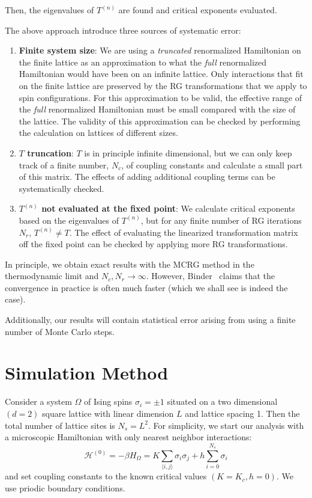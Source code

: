 \documentclass[12pt]{article}
\begin{document}
Then, the eigenvalues of $T^{(n)}$ are found and critical exponents evaluated.

The above approach introduce three sources of systematic error:
\renewcommand{\labelenumi}{(\roman{enumi})}
\begin{enumerate}
  \item \textbf{Finite system size}: We are using a \textit{truncated} renormalized Hamiltonian on the finite lattice as an approximation to what the \textit{full} renormalized Hamiltonian would have been on an infinite lattice. Only interactions that fit on the finite lattice are preserved by the RG transformations that we apply to spin configurations. For this approximation to be valid, the effective range of the \textit{full} renormalized Hamiltonian must be small compared with the size of the lattice. The validity of this approximation can be checked by performing the calculation on lattices of different sizes.
  \item \textbf{$T$ truncation}: $T$ is in principle infinite dimensional, but we can only keep track of a finite number, $N_c$, of coupling constants and calculate a small part of this matrix. The effects of adding additional coupling terms can be systematically checked.
  \item \textbf{$T^{(n)}$ not evaluated at the fixed point}: We calculate critical exponents based on the eigenvalues of $T^{(n)}$, but for any finite number of RG iterations $N_r$, $T^{(n)} \neq T$. The effect of evaluating the linearized transformation matrix off the fixed point can be checked by applying more RG transformations.
\end{enumerate}
In principle, we obtain exact results with the MCRG method in the thermodynamic limit and $N_c, N_r \rightarrow \infty$. However, Binder~\cite{Binder2014} claims that the convergence in practice is often much faster (which we shall see is indeed the case).

Additionally, our results will contain statistical error arising from using a finite number of Monte Carlo steps.



\section{Simulation Method}
Consider a system $\Omega$ of Ising spins $\sigma_i = \pm 1$ situated on a two dimensional $(d = 2)$ square lattice with linear dimension $L$ and lattice spacing 1. Then the total number of lattice sites is $N_s = L^2$. For simplicity, we start our analysis with a microscopic Hamiltonian with only nearest neighbor interactions:
\begin{equation}
\mathcal{H}^{(0)} = -\beta H_\Omega = K\sum_{\langle i,j\rangle} \sigma_i \sigma_j + h\sum_{i = 0}^{N_s} \sigma_i
\end{equation}
and set coupling constants to the known critical values $(K = K_c, h = 0)$. We use priodic boundary conditions. 
\end{document}

